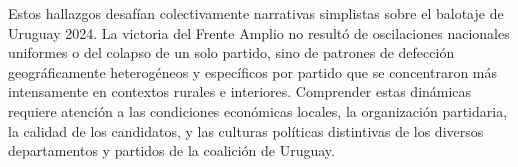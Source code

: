 Estos hallazgos desafían colectivamente narrativas simplistas sobre el balotaje de Uruguay 2024. La victoria del Frente Amplio no resultó de oscilaciones nacionales uniformes o del colapso de un solo partido, sino de patrones de defección geográficamente heterogéneos y específicos por partido que se concentraron más intensamente en contextos rurales e interiores. Comprender estas dinámicas requiere atención a las condiciones económicas locales, la organización partidaria, la calidad de los candidatos, y las culturas políticas distintivas de los diversos departamentos y partidos de la coalición de Uruguay.




